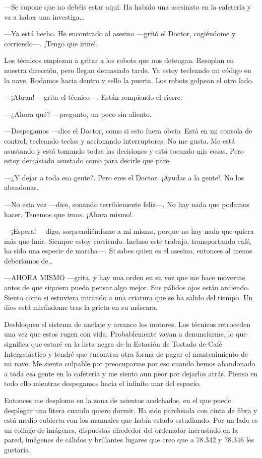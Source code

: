 ---Se supone que no debéis estar aquí. Ha habido una asesinato en la
cafetería y va a haber una investiga\ldots{}

---Ya está hecho. He encontrado al asesino ---gritó el Doctor,
cogiéndome y corriendo---. ¡Tengo que irme!.

Los técnicos empiezan a gritar a los robots que nos detengan. Resoplan
en nuestra dirección, pero llegan demasiado tarde. Ya estoy tecleando mi
código en la nave. Rodamos hacia dentro y sello la puerta. Los robots
golpean el otro lado.

---¡Abran! ---grita el técnico---. Están rompiendo el cierre.

---¿Ahora qué? ---pregunto, un poco sin aliento.

---Despegamos ---dice el Doctor, como si esto fuera obvio. Está en mi
consola de control, tecleando teclas y accionando interruptores. No me
gusta. Me está asustando y está tomando todas las decisiones y está
tocando mis cosas. Pero estoy demasiado asustado como para decirle que
pare.

---¿Y dejar a toda esa gente?. Pero eres el Doctor. ¡Ayudas a la
gente!. No los abandonas.

---No esta vez ---dice, sonando terriblemente feliz---. No hay nada que
podamos hacer. Tenemos que irnos. ¡Ahora mismo!.

---¡Espera! ---digo, sorprendiéndome a mi mismo, porque no hay nada que
quiera más que huir. Siempre estoy corriendo. Incluso este trabajo,
transportando café, ha sido una especie de marcha---. Si sabes quien es
el asesino, entonces al menos deberíamos de\ldots{}

---AHORA MISMO ---grita, y hay una orden en su voz que me hace moverme
antes de que siquiera pueda pensar algo mejor. Sus pálidos ojos están
ardiendo. Siento como si estuviera mirando a una criatura que se ha
salido del tiempo. Un dios está mirándome tras la grieta en su máscara.

Desbloqueo el sistema de anclaje y arranco los motores. Los técnicos
retroceden una vez que estos rugen con vida. Probablemente vayan a
denunciarme, lo que significa que estaré en la lista negra de la
Estación de Tostado de Café Intergaláctico y tendré que encontrar otra
forma de pagar el mantenimiento de mi nave. Me siento culpable por
preocuparme por eso cuando hemos abandonado a toda esa gente en la
cafetería y me siento aun peor por dejarlos atrás. Pienso en todo ello
mientras despegamos hacia el infinito mar del espacio.

Entonces me desplomo en la zona de asientos acolchados, en el que puedo
desplegar una litera cuando quiero dormir. Ha sido parcheada con cinta
de fibra y está medio cubierta con los manuales que había estado
estudiando. Por un lado es un collage de imágenes, dispuestas alrededor
del ordenador incrustado en la pared, imágenes de cálidos y brillantes
lugares que creo que a 78.342 y 78.346 les gustaría.


